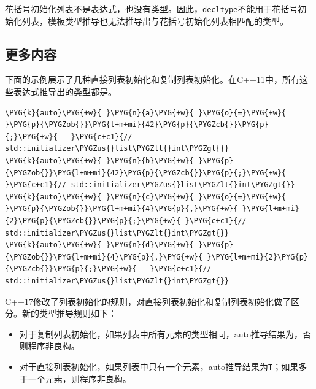 
\begin{myNote}
花括号初始化列表不是表达式，也没有类型。因此，\texttt{decltype}不能用于花括号初始化列表，模板类型推导也无法推导出与花括号初始化列表相匹配的类型。
\end{myNote}



\subsection{更多内容}



下面的示例展示了几种直接列表初始化和复制列表初始化。在C++11中，所有这些表达式推导出的类型都是。



\begin{codeblockbg}
\begin{Verbatim}[commandchars=\\\{\},breaklines=true,breakanywhere=true,fontsize=\codefont,xleftmargin=17bp]
\PYG{k}{auto}\PYG{+w}{ }\PYG{n}{a}\PYG{+w}{ }\PYG{o}{=}\PYG{+w}{ }\PYG{p}{\PYGZob{}}\PYG{l+m+mi}{42}\PYG{p}{\PYGZcb{}}\PYG{p}{;}\PYG{+w}{   }\PYG{c+c1}{// std::initializer\PYGZus{}list\PYGZlt{}int\PYGZgt{}}
\PYG{k}{auto}\PYG{+w}{ }\PYG{n}{b}\PYG{+w}{ }\PYG{p}{\PYGZob{}}\PYG{l+m+mi}{42}\PYG{p}{\PYGZcb{}}\PYG{p}{;}\PYG{+w}{     }\PYG{c+c1}{// std::initializer\PYGZus{}list\PYGZlt{}int\PYGZgt{}}
\PYG{k}{auto}\PYG{+w}{ }\PYG{n}{c}\PYG{+w}{ }\PYG{o}{=}\PYG{+w}{ }\PYG{p}{\PYGZob{}}\PYG{l+m+mi}{4}\PYG{p}{,}\PYG{+w}{ }\PYG{l+m+mi}{2}\PYG{p}{\PYGZcb{}}\PYG{p}{;}\PYG{+w}{ }\PYG{c+c1}{// std::initializer\PYGZus{}list\PYGZlt{}int\PYGZgt{}}
\PYG{k}{auto}\PYG{+w}{ }\PYG{n}{d}\PYG{+w}{ }\PYG{p}{\PYGZob{}}\PYG{l+m+mi}{4}\PYG{p}{,}\PYG{+w}{ }\PYG{l+m+mi}{2}\PYG{p}{\PYGZcb{}}\PYG{p}{;}\PYG{+w}{   }\PYG{c+c1}{// std::initializer\PYGZus{}list\PYGZlt{}int\PYGZgt{}}
\end{Verbatim}
\end{codeblockbg}



C++17修改了列表初始化的规则，对直接列表初始化和复制列表初始化做了区分。新的类型推导规则如下：



\begin{itemize}
\item 对于复制列表初始化，如果列表中所有元素的类型相同，auto推导结果为，否则程序非良构。



\item 对于直接列表初始化，如果列表中只有一个元素，auto推导结果为\texttt{T}；如果多于一个元素，则程序非良构。

\end{itemize}


